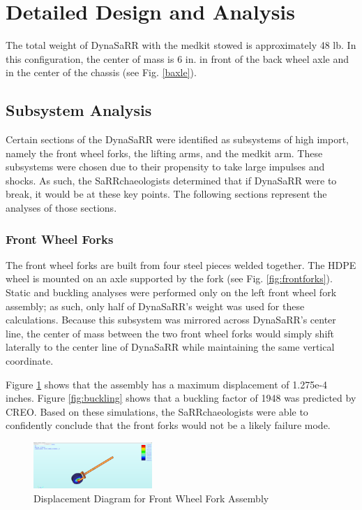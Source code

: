\section{Detailed Design and Analysis}

The total weight of DynaSaRR with the medkit stowed is approximately 48 lb. In this configuration, the center of mass is 6 in. in front of the back wheel axle and in the center of the chassis (see Fig. \ref{baxle}). 


\subsection{Subsystem Analysis}
Certain sections of the DynaSaRR were identified as subsystems of high import, namely the front wheel forks, the lifting arms, and the medkit arm. These subsystems were chosen due to their propensity to take large impulses and shocks. As such, the SaRRchaeologists determined that if DynaSaRR were to break, it would be at these key points. The following sections represent the analyses of those sections.

\subsubsection{Front Wheel Forks}
The front wheel forks are built from four steel pieces welded together. The HDPE wheel is mounted on an axle supported by the fork (see Fig. \ref{fig:frontforks}). Static and buckling analyses were performed only on the left front wheel fork assembly; as such, only half of DynaSaRR's weight was used for these calculations. Because this subsystem was mirrored across DynaSaRR's center line, the center of mass between the two front wheel forks would simply shift laterally to the center line of DynaSaRR while maintaining the same vertical coordinate.

Figure \ref{fig:displacement} shows that the assembly has a maximum displacement of 1.275e-4 inches. Figure \ref{fig:buckling} shows that a buckling factor of 1948 was predicted by CREO. Based on these simulations, the SaRRchaeologists were able to confidently conclude that the front forks would not be a likely failure mode.

\begin{figure}[hp]
    \centering
    \includegraphics[width=0.4\textwidth]{Images/front_wheel_disp.PNG}
    \caption{Displacement Diagram for Front Wheel Fork Assembly}
    \label{fig:displacement}
\end{figure}
\newpage

